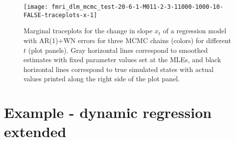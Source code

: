 \documentclass{article}
\begin{document}
\begin{figure}[ht]
\texttt{[image: fmri\_dlm\_mcmc\_test-20-6-1-M011-2-3-11000-1000-10-FALSE-traceplots-x-1]}
\caption{Marginal traceplots for the change in slope $x_t$ of a regression model with AR(1)+WN errors for three MCMC chains (colors) for different $t$ (plot panels). Gray horizontal lines correspond to smoothed estimates with fixed parameter values set at the MLEs, and black horizontal lines correspond to true simulated states with actual values printed along the right side of the plot panel.} \label{fig:tracex-arwn}
\end{figure}

%

\clearpage

\section{Example - dynamic regression extended} \label{sec:drext}
\end{document}
